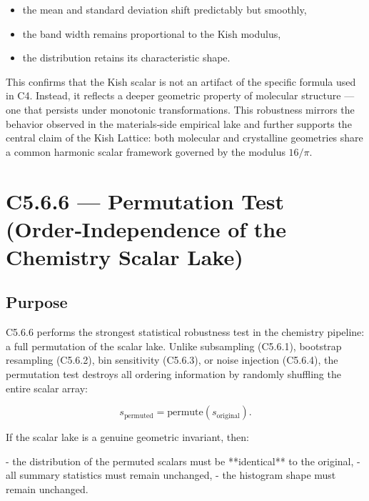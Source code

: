 \documentclass[11pt, letterpaper, openany]{book}
\begin{document}
\begin{itemize}
    \item the mean and standard deviation shift predictably but smoothly,
    \item the band width remains proportional to the Kish modulus,
    \item the distribution retains its characteristic shape.
\end{itemize}

This confirms that the Kish scalar is not an artifact of the specific formula
used in C4. Instead, it reflects a deeper geometric property of molecular
structure — one that persists under monotonic transformations. This robustness
mirrors the behavior observed in the materials‑side empirical lake and further
supports the central claim of the Kish Lattice: both molecular and crystalline
geometries share a common harmonic scalar framework governed by the modulus
\(16/\pi\).


\section{C5.6.6 — Permutation Test (Order‑Independence of the Chemistry Scalar Lake)}

\subsection*{Purpose}
C5.6.6 performs the strongest statistical robustness test in the chemistry
pipeline: a full permutation of the scalar lake. Unlike subsampling (C5.6.1),
bootstrap resampling (C5.6.2), bin sensitivity (C5.6.3), or noise injection
(C5.6.4), the permutation test destroys all ordering information by randomly
shuffling the entire scalar array:



\[
s_{\text{permuted}} = \text{permute}(s_{\text{original}}).
\]



If the scalar lake is a genuine geometric invariant, then:

- the distribution of the permuted scalars must be **identical** to the original,
- all summary statistics must remain unchanged,
- the histogram shape must remain unchanged.
\end{document}
